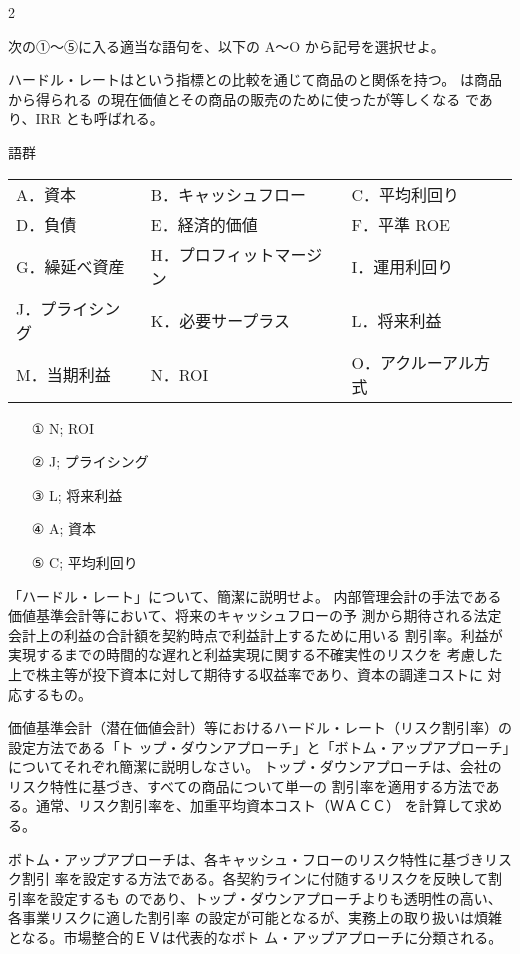 2\documentclass[report,gutter=10mm,fore-edge=10mm,uplatex,dvipdfmx]{jlreq}
\begin{document}
次の①～⑤に入る適当な語句を、以下の A～O から記号を選択せよ。

ハードル・レートはという指標との比較を通じて商品のと関係を持つ。
は商品から得られる
の現在価値とその商品の販売のために使ったが等しくなる
であり、IRR とも呼ばれる。

語群
\begin{tabular}{lll}
A．資本 & B．キャッシュフロー& C．平均利回り\\
D．負債 &E．経済的価値 & F．平準 ROE\\
G．繰延べ資産 & H．プロフィットマージン&  I．運用利回り\\
J．プライシング & K．必要サープラス&L．将来利益 \\
M．当期利益 &N．ROI &O．アクルーアル方式 \\
\end{tabular}

\answer{}
\begin{itemize}
\item[①] N; ROI
\item[②] J; プライシング
\item[③] L; 将来利益 
\item[④] A; 資本
\item[⑤] C; 平均利回り
\end{itemize}

「ハードル・レート」について、簡潔に説明せよ。
\answer{}
内部管理会計の手法である価値基準会計等において、将来のキャッシュフローの予
測から期待される法定会計上の利益の合計額を契約時点で利益計上するために用いる
割引率。利益が実現するまでの時間的な遅れと利益実現に関する不確実性のリスクを
考慮した上で株主等が投下資本に対して期待する収益率であり、資本の調達コストに
対応するもの。

価値基準会計（潜在価値会計）等におけるハードル・レート（リスク割引率）の設定方法である「ト
ップ・ダウンアプローチ」と「ボトム・アップアプローチ」についてそれぞれ簡潔に説明しなさい。
\answer{}
トップ・ダウンアプローチは、会社のリスク特性に基づき、すべての商品について単一の
割引率を適用する方法である。通常、リスク割引率を、加重平均資本コスト（ＷＡＣＣ）
を計算して求める。

ボトム・アップアプローチは、各キャッシュ・フローのリスク特性に基づきリスク割引
率を設定する方法である。各契約ラインに付随するリスクを反映して割引率を設定するも
のであり、トップ・ダウンアプローチよりも透明性の高い、各事業リスクに適した割引率
の設定が可能となるが、実務上の取り扱いは煩雑となる。市場整合的ＥＶは代表的なボト
ム・アップアプローチに分類される。
\end{document}
